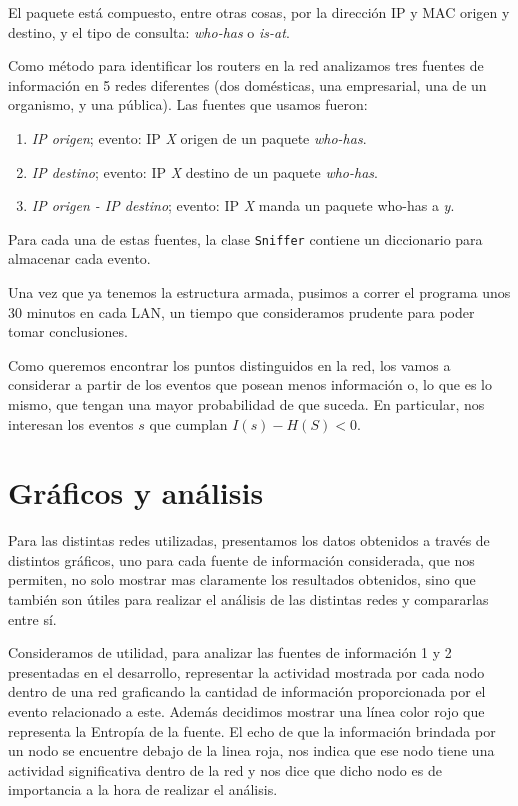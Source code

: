 \documentclass[a4paper, 11pt]{article}
\begin{document}
El paquete est\'a compuesto, entre otras cosas, por la direcci\'on IP y MAC origen y destino, y el tipo de consulta: \textit{who-has} o \textit{is-at}. 

Como m\'etodo para identificar los routers en la red analizamos tres fuentes de informaci\'on en 5 redes diferentes (dos dom\'esticas, una empresarial, una de un organismo, y una p\'ublica). Las fuentes que usamos fueron: 

\begin{enumerate}
 \item {\it IP origen}; evento: IP {\it X} origen de un paquete {\it who-has}.
 \item {\it IP destino}; evento: IP {\it X} destino de un paquete {\it who-has}.
 \item {\it IP origen - IP destino}; evento: IP {\it X} manda un paquete who-has a {\it y}.
\end{enumerate}

Para cada una de estas fuentes, la clase \texttt{Sniffer} contiene un diccionario para almacenar cada evento. 

Una vez que ya tenemos la estructura armada, pusimos a correr el programa unos 30 minutos en cada LAN, un tiempo que consideramos prudente para poder tomar conclusiones. 

Como queremos encontrar los puntos distinguidos en la red, los vamos a considerar a partir de los eventos que posean menos informaci\'on o, lo que es lo mismo, que tengan una mayor probabilidad de que suceda. En particular, nos interesan los eventos $s$ que cumplan $I(s) - H(S) < 0$. 

\section{Gráficos y análisis}

Para las distintas redes utilizadas, presentamos los datos obtenidos a trav\'es de distintos gr\'aficos, uno para cada fuente de informaci\'on considerada, que nos permiten, no solo mostrar mas claramente los resultados obtenidos, sino que tambi\'en son \'utiles para realizar el an\'alisis de las distintas redes y compararlas entre s\'i.

Consideramos de utilidad, para analizar las fuentes de informaci\'on 1 y 2 presentadas en el desarrollo, representar la actividad mostrada por cada nodo dentro de una red graficando la cantidad de informaci\'on  proporcionada por el evento relacionado a este. Adem\'as decidimos mostrar una l\'inea color rojo que representa la Entrop\'ia de la fuente. El echo de que la informaci\'on brindada por un nodo se encuentre debajo de la linea roja, nos indica que ese nodo tiene una actividad significativa dentro de la red y nos dice que dicho nodo es de importancia a la hora de realizar el an\'alisis.
\end{document}
